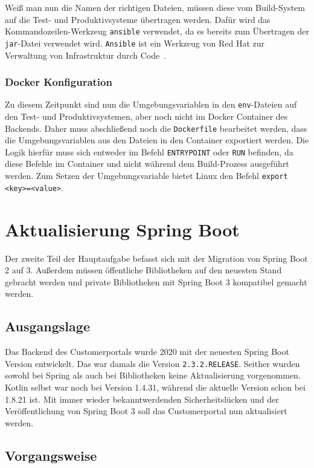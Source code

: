 Weiß man nun die Namen der richtigen Dateien, müssen diese vom Build-System auf die Test- und Produktivsysteme übertragen werden. Dafür wird das Kommandozeilen-Werkzeug \texttt{ansible} verwendet, da es bereits zum Übertragen der \texttt{jar}-Datei verwendet wird. \texttt{Ansible} ist ein Werkzeug von Red Hat zur Verwaltung von Infrastruktur durch Code~\parencite{redhatansible}.

\subsubsection{Docker Konfiguration}

Zu diesem Zeitpunkt sind nun die Umgebungsvariablen in den \texttt{env}-Dateien auf den Test- und Produktivsystemen, aber noch nicht im Docker Container des Backends. Daher muss abschließend noch die \texttt{Dockerfile} bearbeitet werden, dass die Umgebungsvariablen aus den Dateien in den Container exportiert werden. Die Logik hierfür muss sich entweder im Befehl \texttt{ENTRYPOINT} oder \texttt{RUN} befinden, da diese Befehle im Container und nicht während dem Build-Prozess ausgeführt werden. Zum Setzen der Umgebungsvariable bietet Linux den Befehl \texttt{export <key>=<value>}.

\section{Aktualisierung Spring Boot}

Der zweite Teil der Hauptaufgabe befasst sich mit der Migration von Spring Boot 2 auf 3. Außerdem müssen öffentliche Bibliotheken auf den neuesten Stand gebracht werden und private Bibliotheken mit Spring Boot 3 kompatibel gemacht werden.

\subsection{Ausgangslage}

Das Backend des Customerportals wurde 2020 mit der neuesten Spring Boot Version entwickelt. Das war damals die Version \texttt{2.3.2.RELEASE}. Seither wurden sowohl bei Spring als auch bei Bibliotheken keine Aktualisierung vorgenommen. Kotlin selbst war noch bei Version 1.4.31, während die aktuelle Version schon bei 1.8.21 ist. Mit immer wieder bekanntwerdenden Sicherheitslücken und der Veröffentlichung von Spring Boot 3 soll das Customerportal nun aktualisiert werden.

\subsection{Vorgangsweise}


